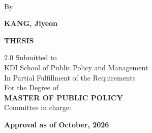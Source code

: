 \begin{titlepage}
\singlespacing
\begin{center}
\vspace*{2.2cm}
{\fontsize{13}{20}\selectfont\bfseries
 \makebox[\textwidth][c]{\thesistitleA}\\
 \makebox[\textwidth][c]{\thesistitleB}\par}
\vspace{2.2cm}
By\par
\vspace{0.3cm}
{\bfseries KANG, Jiyeon\par}
\vspace{2.2cm}
{\bfseries THESIS\par}
\vspace{1cm}
\begin{spacing}{2.0}
Submitted to\\
KDI School of Public Policy and Management\\
In Partial Fulfillment of the Requirements\\
For the Degree of\\
{\bfseries MASTER OF PUBLIC POLICY}\\
Committee in charge:
\end{spacing}
\vspace{0.6cm}
\vspace{0.6cm}
\par
\vspace{1.5cm}
\par
\vspace{1.4cm}

{\bfseries Approval as of October, 2026\par}
\end{center}
\end{titlepage}

